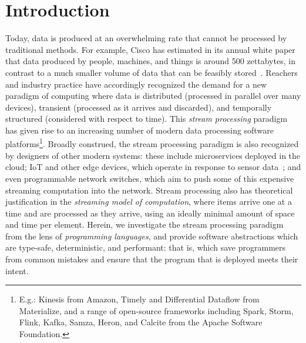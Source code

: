\section{Introduction}
\label{sec:intro}

Today, data is produced at an overwhelming rate
that cannot be processed by traditional methods.
For example, Cisco has estimated in its annual white paper
that data produced by people, machines, and things
is around 500 zettabytes, in contrast to a much smaller volume
of data that can be feasibly stored~\cite{index2018forecast}.
Reachers and industry practice have accordingly recognized the demand
for a new paradigm of computing where data is
distributed (processed in parallel over many devices),
transient (processed as it arrives and discarded),
and temporally structured (considered with respect to time).
This \emph{stream processing} paradigm has given rise to an increasing number
of modern data processing software platforms\footnote{E.g.: Kinesis from Amazon, Timely and Differential Dataflow from Materialize, and a range of open-source frameworks including Spark, Storm, Flink, Kafka, Samza, Heron, and Calcite from the Apache Software Foundation.}.
Broadly construed, the stream processing paradigm is also recognized by designers of other modern systems: these include microservices deployed in the cloud; IoT and other edge devices, which operate in response
to sensor data~\cite{shi2016edge, ashton2009internet}; and even programmable network switches,
which aim to push some of this expensive streaming computation
into the network.
Stream processing also has theoretical justification in the \emph{streaming model of computation},
where items arrive one at a time and are processed as they arrive, using
an ideally minimal amount of space and time per element.
Herein, we investigate the stream processing paradigm from the lens of \emph{programming languages}, and provide software abstractions which are type-safe, deterministic, and performant: that is, which save programmers from common mistakes and ensure that the program that is deployed meets their intent.

